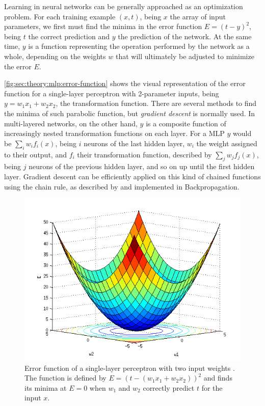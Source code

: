 Learning in neural networks can be generally approached as an optimization problem.
For each training example $(x, t)$, being $x$ the array of input parameters, we first must find the minima in the error function $E = (t - y)^2$, being $t$ the correct prediction and $y$ the prediction of the network.
At the same time, $y$ is a function representing the operation performed by the network as a whole, depending on the weights $w$ that will ultimately be adjusted to minimize the error $E$.

\autoref{fig:sec:theory:mlp:error-function} shows the visual representation of the error function for a single-layer perceptron with 2-parameter inputs, being $y = w_1 x_1 + w_2 x_2$, the transformation function.
There are several methods to find the minima of such parabolic function, but \emph{gradient descent} is normally used.
In multi-layered networks, on the other hand, $y$ is a composite function of increasingly nested transformation functions on each layer.
For a MLP $y$ would be $\sum_i w_i f_i(x)$, being $i$ neurons of the last hidden layer, $w_i$ the weight assigned to their output, and $f_i$ their transformation function, described by $\sum_j w_j f_j(x)$, being $j$ neurons of the previous hidden layer, and so on up until the first hidden layer.
Gradient descent can be efficiently applied on this kind of chained functions using the chain rule, as described by \citet{Linnainmaa1976} and implemented in Backpropagation.

\begin{figure}[htb]
  \includegraphics[width=\textwidth]{gfx/error-function}
  \caption{Error function of a single-layer perceptron with two input weights \cite{AI4562013}.
    The function is defined by $E = (t - (w_1 x_1 + w_2 x_2))^2$ and finds its minima at $E = 0$ when $w_1$ and $w_2$ correctly predict $t$ for the input $x$.}
  \label{fig:sec:theory:mlp:error-function}
\end{figure}

